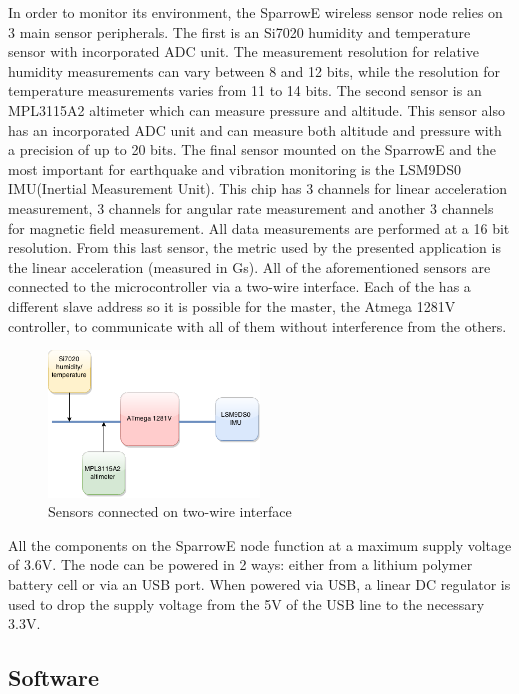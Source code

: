 In order to monitor its environment, the SparrowE wireless sensor node relies on 3 main sensor peripherals. The first is 
an Si7020 humidity and temperature sensor\cite{Si7020} with incorporated ADC unit. The measurement resolution for relative humidity measurements
can vary between 8 and 12 bits, while the resolution for temperature measurements varies from 11 to 14 bits. The second sensor is 
an MPL3115A2 \cite{MPL3115A2} altimeter which can measure pressure and altitude. This sensor also has an incorporated ADC unit and can measure 
both altitude and pressure with a precision of up to 20 bits. The final sensor mounted on the SparrowE and the most important for 
earthquake and vibration monitoring is the LSM9DS0 IMU(Inertial Measurement Unit)\cite{LSM9DS0}. This chip has 3 channels for linear acceleration measurement, 
3 channels for angular rate measurement and another 3 channels for magnetic field measurement. All data measurements are performed at a 
16 bit resolution. From this last sensor, the metric used by the presented application is the linear acceleration (measured in Gs).
All of the aforementioned sensors are connected to the microcontroller via a two-wire interface. Each of the has a different slave address so 
it is possible for the master, the Atmega 1281V controller, to communicate with all of them without interference from the others.

\begin{figure}[ht] \centering
  \includegraphics[width=0.5\textwidth]{img/i2c-connection.png}
  \caption{Sensors connected on two-wire interface}
\end{figure}

All the components on the SparrowE node function at a maximum supply voltage of 3.6V. The node can be powered in 2 ways: either from a lithium polymer battery 
cell or via an USB port. When powered via USB, a linear DC regulator is used to drop the supply voltage from the 5V of the USB line to the necessary 3.3V.

\subsection{Software}

